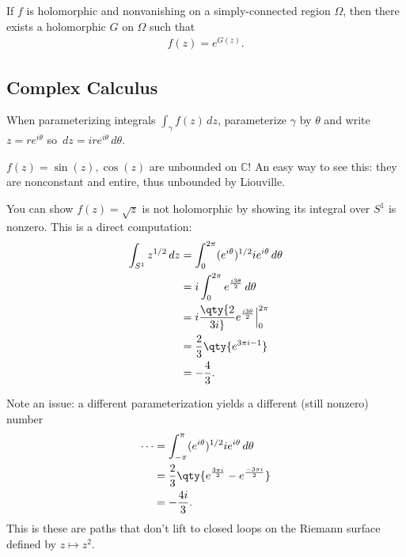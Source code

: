 \begin{theorem}

If \(f\) is holomorphic and nonvanishing on a simply-connected region
\(\Omega\), then there exists a holomorphic \(G\) on \(\Omega\) such
that
\begin{align*}
f(z) = e^{G(z)}
.\end{align*}

\end{theorem}

\hypertarget{complex-calculus}{%
\subsection{Complex Calculus}\label{complex-calculus}}

\begin{remark}

When parameterizing integrals \(\int_\gamma f(z)\,dz\), parameterize
\(\gamma\) by \(\theta\) and write \(z=re^{i\theta}\) so
\(\,dz= ire^{i\theta}\,d\theta\).

\end{remark}

\begin{warnings}

\(f(z) = \sin(z), \cos(z)\) are unbounded on \({\mathbb{C}}\)! An easy
way to see this: they are nonconstant and entire, thus unbounded by
Liouville.

\end{warnings}

\begin{example}[?]

You can show \(f(z) = \sqrt{z}\) is not holomorphic by showing its
integral over \(S^1\) is nonzero. This is a direct computation:
\begin{align*}
\int_{S^1} z^{1/2} \,dz
&= \int_0^{2\pi} (e^{i\theta})^{1/2} ie^{i\theta} \,d\theta\\
&= i \int_0^{2\pi} e^{i3\theta \over 2}\,d\theta\\
&= i \qty{2\over 3i} e^{i3\theta \over 2}\Big|_{0}^{2\pi} \\
&= {2\over 3}\qty{e^{3\pi i - 1}} \\
&= -{4\over 3}
.\end{align*}

Note an issue: a different parameterization yields a different (still
nonzero) number
\begin{align*}
\cdots 
&= \int_{-\pi}^{\pi} (e^{i\theta})^{1/2} ie^{i\theta} \,d\theta\\
&= {2\over 3}\qty{ e^{3\pi i \over 2} - e^{-3\pi i \over 2}} \\
&= -{4i\over 3}
.\end{align*}
This is these are paths that don't lift to closed loops on the Riemann
surface defined by \(z\mapsto z^2\).

\end{example}

